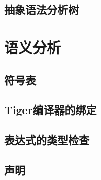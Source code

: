 \documentclass[cn,11pt,chinese]{elegantbook}
\begin{document}
\section{抽象语法分析树}

\chapter{语义分析}

\section{符号表}

\section{Tiger编译器的绑定}

\section{表达式的类型检查}

\section{声明}
\end{document}
